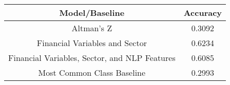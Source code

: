\footnotesize
\begin{tabular}{cc}
\toprule
Model/Baseline & Accuracy \\
\midrule
Altman's Z & 0.3092 \\
Financial Variables and Sector & 0.6234 \\
Financial Variables, Sector, and NLP Features & 0.6085 \\
Most Common Class Baseline & 0.2993 \\
\bottomrule
\end{tabular}

\normalsize